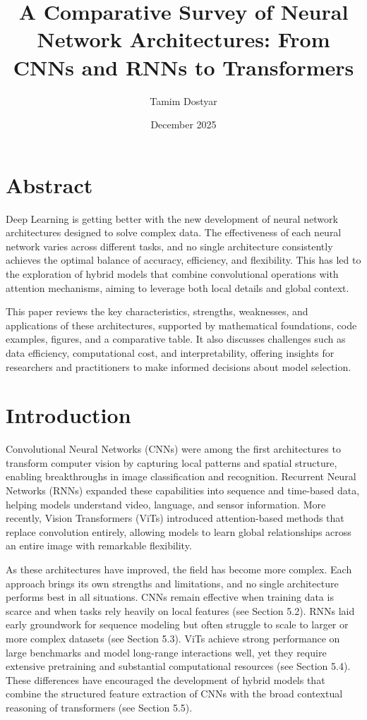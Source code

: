 \documentclass[12pt]{article}
\author{Tamim Dostyar}
\date{December 2025}
\title{A Comparative Survey of Neural Network Architectures: From CNNs and RNNs to Transformers}
\begin{document}
\maketitle

\section{Abstract}

Deep Learning is getting better with the new development of neural network architectures designed to solve complex data. The effectiveness of each neural network varies across different tasks, and no single architecture consistently achieves the optimal balance of accuracy, efficiency, and flexibility. This has led to the exploration of hybrid models that combine convolutional operations with attention mechanisms, aiming to leverage both local details and global context. 

This paper reviews the key characteristics, strengths, weaknesses, and applications of these architectures, supported by mathematical foundations, code examples, figures, and a comparative table. It also discusses challenges such as data efficiency, computational cost, and interpretability, offering insights for researchers and practitioners to make informed decisions about model selection.

\newpage
\section{Introduction}

Convolutional Neural Networks (CNNs) were among the first architectures to transform computer vision by capturing local patterns and spatial structure, enabling breakthroughs in image classification and recognition. Recurrent Neural Networks (RNNs) expanded these capabilities into sequence and time-based data, helping models understand video, language, and sensor information. More recently, Vision Transformers (ViTs) introduced attention-based methods that replace convolution entirely, allowing models to learn global relationships across an entire image with remarkable flexibility.

As these architectures have improved, the field has become more complex. Each approach brings its own strengths and limitations, and no single architecture performs best in all situations. CNNs remain effective when training data is scarce and when tasks rely heavily on local features (see Section 5.2). RNNs laid early groundwork for sequence modeling but often struggle to scale to larger or more complex datasets (see Section 5.3). ViTs achieve strong performance on large benchmarks and model long-range interactions well, yet they require extensive pretraining and substantial computational resources (see Section 5.4). These differences have encouraged the development of hybrid models that combine the structured feature extraction of CNNs with the broad contextual reasoning of transformers (see Section 5.5).
\end{document}
